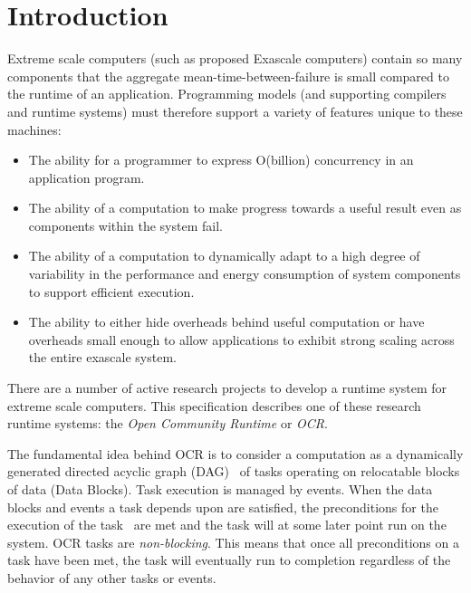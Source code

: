 %

\chapter{Introduction}
\label{chap:introduction}
Extreme scale computers (such as proposed Exascale computers) contain
so many components that the aggregate mean-time-between-failure is small
compared to the runtime of an application. Programming models (and
supporting compilers and runtime systems) must therefore support a
variety of features unique to these machines:
\begin{itemize}
\item The ability for a programmer to
express O(billion) concurrency in an application program.

\item The ability of a computation to make progress towards a useful
result even as components within the system fail.

\item The ability of a computation to dynamically adapt to a high
degree of variability in the performance and energy consumption of
system components to support efficient execution.

\item The ability to either hide overheads behind useful computation
or have overheads small enough to allow applications to exhibit strong
scaling across the entire exascale system.

\end{itemize}

There are a number of active research projects to develop a runtime system
for extreme scale computers. This specification describes one of
these research runtime systems: the \emph{Open Community Runtime} or \emph{OCR}.

The fundamental idea behind OCR is to consider a computation as a
dynamically generated directed acyclic graph (DAG) ~\cite{TaSa11,Tasirlar11,Zuckerman:2011:UCP:2000417.2000424}of tasks
operating on relocatable blocks of data (Data Blocks). Task execution is managed by events.
When the data blocks and events a task depends upon are satisfied, the
preconditions for the execution of the task~\cite{SSWS13} are met and the
task will at some later point run on the system.   OCR tasks are
\emph{non-blocking}. This means that once all
preconditions on a task have been met,  the task will eventually run to completion
regardless of the behavior of any other tasks or events.

